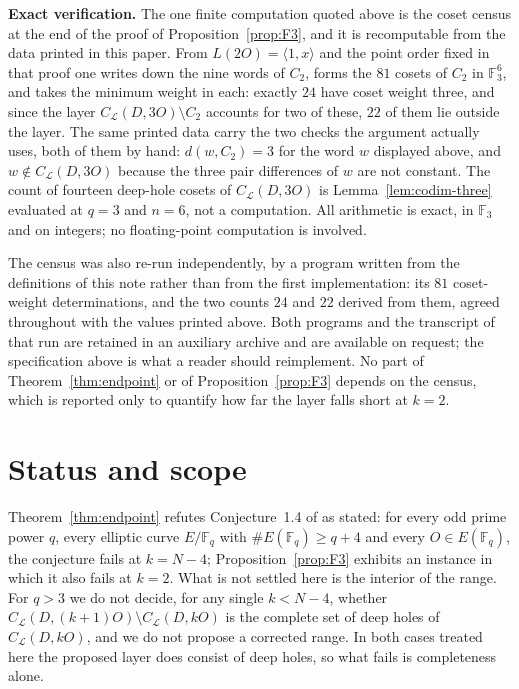 \documentclass[11pt]{amsart}
\newcommand{\F}{\mathbb{F}}
\newcommand{\CL}{C_{\mathcal L}}
\begin{document}
\medskip
\noindent\textbf{Exact verification.}
The one finite computation quoted above is the coset census at the end of the
proof of Proposition~\ref{prop:F3}, and it is recomputable from the data
printed in this paper. From $L(2O)=\langle1,x\rangle$ and the point order fixed
in that proof one writes down the nine words of $C_2$, forms the $81$ cosets of
$C_2$ in $\F_3^6$, and takes the minimum weight in each: exactly $24$ have
coset weight three, and since the layer $\CL(D,3O)\setminus C_2$ accounts for
two of these, $22$ of them lie outside the layer. The same printed data carry
the two checks the argument actually uses, both of them by hand:
$d(w,C_2)=3$ for the word $w$ displayed above, and $w\notin\CL(D,3O)$ because
the three pair differences of $w$ are not constant. The count of fourteen
deep-hole cosets of $\CL(D,3O)$ is Lemma~\ref{lem:codim-three} evaluated at
$q=3$ and $n=6$, not a computation. All arithmetic is exact, in $\F_3$ and on
integers; no floating-point computation is involved.

The census was also re-run independently, by a program written from the
definitions of this note rather than from the first implementation: its $81$
coset-weight determinations, and the two counts $24$ and $22$ derived from
them, agreed throughout with the values printed above. Both programs and the
transcript of that run are retained in an auxiliary archive and are available
on request; the specification above is what a reader should reimplement. No
part of Theorem~\ref{thm:endpoint} or of Proposition~\ref{prop:F3} depends on
the census, which is reported only to quantify how far the layer falls short
at $k=2$.

\section*{Status and scope}

Theorem~\ref{thm:endpoint} refutes Conjecture~1.4 of \cite{ZhangWan} as
stated: for every odd prime power $q$, every elliptic curve $E/\F_q$ with
$\#E(\F_q)\ge q+4$ and every $O\in E(\F_q)$, the conjecture fails at
$k=N-4$; Proposition~\ref{prop:F3} exhibits an instance in which it also
fails at $k=2$. What is not settled here is the interior of the range.
For $q>3$ we do not decide, for any single $k<N-4$, whether
$\CL(D,(k+1)O)\setminus\CL(D,kO)$ is the complete set of deep holes of
$\CL(D,kO)$, and we do not propose a corrected range. In both cases
treated here the proposed layer does consist of deep holes, so what fails
is completeness alone.
\end{document}

